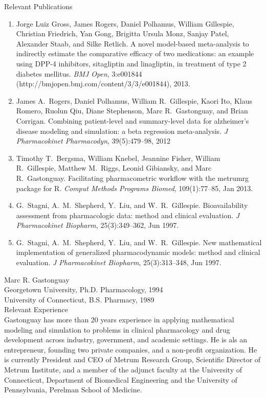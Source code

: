 \documentclass[11pt]{nih2016}
\begin{document}
\noindent
{\sc Relevant Publications}
\vspace*{-3pt}
\begin{enumerate}
\item Jorge Luiz Gross, James Rogers, Daniel Polhamus, William
  Gillespie, Christian Friedrich, Yan Gong, Brigitta Ursula Monz,
  Sanjay Patel, Alexander Staab, and Silke Retlich. A novel
  model-based meta-analysis to indirectly estimate the comparative
  efficacy of two medications: an example using DPP-4 inhibitors,
  sitagliptin and linagliptin, in treatment of type 2 diabetes
  mellitus. {\it BMJ Open}, 3:e001844
  (http://bmjopen.bmj.com/content/3/3/e001844), 2013. 
\item James A.\ Rogers, Daniel Polhamus, William R.\ Gillespie, Kaori Ito,
  Klaus Romero, Ruolun Qiu, Diane Stephenson, Marc R.\ Gastonguay, and
  Brian Corrigan. Combining patient-level and summary-level data for
  alzheimer’s disease modeling and simulation: a beta regression
  meta-analysis. {\it J Pharmacokinet Pharmacodyn}, 39(5):479--98, 2012
\item Timothy T.\ Bergsma, William Knebel, Jeannine Fisher, William R.\
  Gillespie, Matthew M.\ Riggs, Leonid Gibiansky, and Marc R.\
  Gastonguay. Facilitating pharmacometric workflow with the metrumrg
  package for R. {\it Comput Methods Programs Biomed}, 109(1):77--85, Jan
  2013. 
\item G.\ Stagni, A.\ M.\ Shepherd, Y.\ Liu, and W.\ R.\
  Gillespie. Bioavailability assessment from pharmacologic data:
  method and clinical evaluation. {\it J Pharmacokinet Biopharm},
  25(3):349--362, Jun 1997.
\item G.\ Stagni, A.\ M.\ Shepherd, Y.\ Liu, and W.\ R.\ Gillespie. New
  mathematical implementation of generalized pharmacodynamic models:
  method and clinical evaluation. {\it J Pharmacokinet Biopharm},
  25(3):313--348, Jun 1997. 
\end{enumerate}

\vspace*{12pt}
\noindent
{\sc Marc R. Gastonguay}
\\[2pt]
Georgetown University, Ph.D. Pharmacology, 1994 \\
University of Connecticut, B.S. Pharmacy, 1989
\\

\noindent
{\sc Relevant Experience} \\[2pt]
Gastonguay has more than 20 years experience in applying mathematical
modeling and simulation to problems in clinical pharmacology and drug
development across industry, government, and academic settings. He is
als an entrepreneur, founding two private companies, and a non-profit
organization. He is currently President and CEO of Metrum Research
Group, Scientific Director of Metrum Institute, and a member of the
adjunct faculty at the University of Connecticut, Department of
Biomedical Engineering and the University of Pennsylvania, Perelman
School of Medicine.  
\\  
\end{document}
